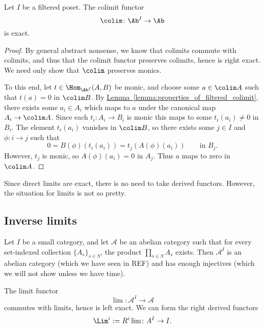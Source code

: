 \documentclass[main.tex]{subfiles}
\begin{document}
\begin{theorem}
  \label{thm:filtered_colimit_left_exact}
  Let $I$ be a filtered poset. The colimit functor
  \begin{equation*}
    \colim\colon \Ab^{I} \to \Ab
  \end{equation*}
  is exact.
\end{theorem}
\begin{proof}
  By general abstract nonsense, we know that colimits commute with colimits, and thus that the colimit functor preserves colimits, hence is right exact. We need only show that $\colim$ preserves monics.

  To this end, let $t \in \Hom_{\Ab^{I}}(A, B)$ be monic, and choose some \(a \in \colim A\) such that \(t(a) = 0\) in \(\colim B\). By \hyperref[lemma:properties_of_filtered_colimit]{Lemma~\ref*{lemma:properties_of_filtered_colimit}}, there exists some \(a_{i} \in A_{i}\) which maps to \(a\) under the canonical map \(A_{i} \to \colim A\). Since each \(t_{i}\colon A_{i} \to B_{i}\) is monic this maps to some \(t_{i}(a_{i}) \neq 0\) in \(B_{i}\). The element \(t_{i}(a_{i})\) vanishes in \(\colim B\), so there exists some \(j \in I\) and \(\phi\colon i \to j\) such that 
  \begin{equation*}
    0 = B(\phi)(t_{i}(a_{i})) = t_{j}(A(\phi)(a_{i}))\qquad\text{in }B_{j}.
  \end{equation*}
  However, \(t_{j}\) is monic, so \(A(\phi)(a_{i}) = 0\) in \(A_{j}\). Thus \(a\) maps to zero in \(\colim A\).
\end{proof}

Since direct limits are exact, there is no need to take derived functors. However, the situation for limits is not so pretty.

\subsection{Inverse limits}
\label{ssc:inverse_limits}

Let $I$ be a small category, and let $\mathcal{A}$ be an abelian category such that for every set-indexed collection $\{A_{s}\}_{s \in S}$, the product $\prod_{s \in S} A_{s}$ exists. Then $\mathcal{A}^{I}$ is an abelian category (which we have seen in REF) and has enough injectives (which we will not show unless we have time).

The limit functor
\begin{equation*}
  \lim\colon \mathcal{A}^{I} \to \mathcal{A}
\end{equation*}
commutes with limits, hence is left exact. We can form the right derived functors
\begin{equation*}
  \Lim^{i} := R^{i} \lim \colon A^{I} \to I.
\end{equation*}
\end{document}
